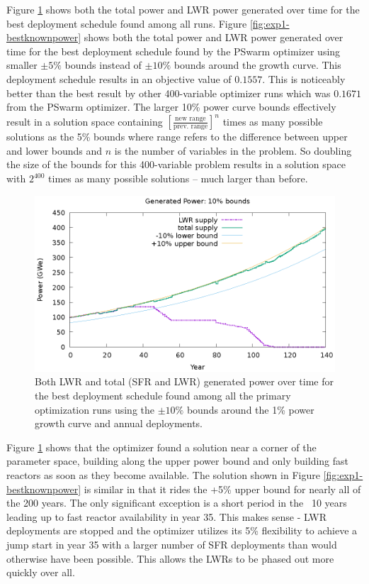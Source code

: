 Figure \ref{fig:exp1-bestfoundpower} shows both the total power and LWR power
generated over time for the best deployment schedule found among all runs.
Figure \ref{fig:exp1-bestknownpower} shows both the total power and LWR power
generated over time for the best deployment schedule found by the PSwarm
optimizer using smaller $\pm5\%$ bounds instead of $\pm10\%$ bounds around the
growth curve. This deployment schedule results in an objective value of
$0.1557$.  This is noticeably better than the best result by other
400-variable optimizer runs which was $0.1671$ from the PSwarm optimizer.  The
larger 10\% power curve bounds effectively result in a solution space
containing $[\frac{\text{new range}}{\text{prev. range}}]^{n}$ times as many
possible solutions as the 5\% bounds where range refers to the difference
between upper and lower bounds and $n$ is the number of variables in the
problem. So doubling the size of the bounds for this 400-variable problem
results in a solution space with $2^{400}$ times as many possible solutions --
much larger than before.

\begin{figure}
    \centering
    \includegraphics[width=1.0\textwidth]{best-found-power.eps}
    \caption[Power for best build schedule with $\pm10\%$ bounds]{ Both
      \gls{LWR} and total (\gls{SFR} and \gls{LWR}) generated power over time
      for the best deployment schedule found among all the primary
      optimization runs using the $\pm10\%$ bounds around the 1\% power growth
      curve and annual deployments.  }

    \label{fig:exp1-bestfoundpower}
\end{figure}

Figure \ref{fig:exp1-bestfoundpower} shows that the optimizer found a solution
near a corner of the parameter space, building along the upper power bound and
only building fast reactors as soon as they become available.  The solution
shown in Figure \ref{fig:exp1-bestknownpower} is similar in that it rides the
+5\% upper bound for nearly all of the 200 years.  The only significant
exception is a short period in the ~10 years leading up to fast reactor
availability in year 35. This makes sense - \gls{LWR} deployments are stopped
and the optimizer utilizes its 5\% flexibility to achieve a jump start in year
35 with a larger number of \gls{SFR} deployments than would otherwise have been
possible.  This allows the \gls{LWR}s to be phased out more quickly over all.

